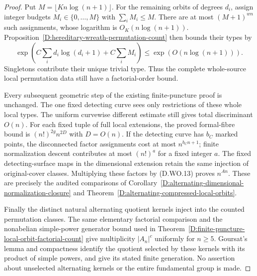 \begin{proof}
Put $M=\lfloor K n\log(n+1)\rfloor$.
For the remaining orbits of degrees $d_i$, assign integer
budgets $M_i\in\{0,\ldots,M\}$ with
$\sum_i M_i\le M$. There are at most $(M+1)^{wn}$ such
assignments, whose logarithm is $O_K(n\log(n+1))$.
Proposition~\ref{D:hereditary-wreath-permutation-count}
then bounds their types by
\[
 \exp\!\left(C\sum_i d_i\log(d_i+1)+C\sum_i M_i\right)
                           \le\exp(O(n\log(n+1))).     \tag{D.WO.13}
\]
Singletons contribute their unique trivial type. Thus
the complete whole-source local permutation data still
have a factorial-order bound.

Every subsequent geometric step of the existing
finite-puncture proof is unchanged. The one fixed
detecting curve sees only restrictions of these whole
local types. The uniform curvewise different estimate
still gives total discriminant $O(n)$. For each fixed
tuple of full local extensions, the proved formal-fibre
bound is $(n!)^{2g}n^{2D}$ with $D=O(n)$.
If the detecting curve has $b_C$ marked points, the
disconnected factor assignments cost at most
$n^{b_Cn+1}$; finite normalization descent contributes
at most $(n!)^a$ for a fixed integer $a$. The fixed
detecting-surface maps in the dimensional extension
retain the same injection of original-cover classes.
Multiplying these factors by (D.WO.13) proves $n^{An}$.
These are precisely the audited comparisons of
Corollary~\ref{D:alternating-dimensional-normalization-closure}
and Theorem~\ref{D:alternating-compressed-local-orbits}.

Finally the distinct natural alternating quotient
kernels inject into the counted permutation classes.
The same elementary factorial comparison and the
nonabelian simple-power generator bound used in
Theorem~\ref{D:finite-puncture-local-orbit-factorial-count}
give multiplicity $|A_n|^c$ uniformly for $n\ge5$.
Goursat's lemma and compactness identify the quotient
selected by these kernels with its product of simple
powers, and give its stated finite generation.
No assertion about unselected alternating kernels or
the entire fundamental group is made.
\end{proof}

